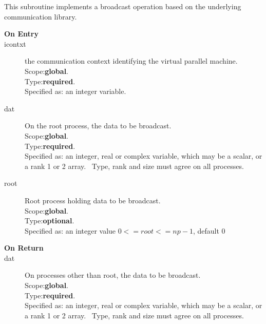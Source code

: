 This subroutine implements a broadcast operation based on the
underlying communication library. 
\begin{description}
\item[\bf  On Entry ]
\item[icontxt] the communication context identifying the virtual
  parallel machine.\\
Scope:{\bf global}.\\
Type:{\bf required}.\\
Specified as: an integer variable.
\item[dat] On the root process, the data to be broadcast.\\
Scope:{\bf global}.\\
Type:{\bf required}.\\
Specified as: an integer, real or complex variable, which may be a
scalar, or a rank 1 or 2 array. \
Type, rank and size must agree on all processes.
\item[root] Root process holding data to be broadcast.\\
Scope:{\bf global}.\\
Type:{\bf optional}.\\
Specified as: an integer value $0<= root <= np-1$, default 0 \
\end{description}


\begin{description}
\item[\bf On Return]
\item[dat] On processes other than  root, the data to be broadcast.\\
Scope:{\bf global}.\\
Type:{\bf required}.\\
Specified as: an integer, real or complex variable, which may be a
scalar, or a rank 1 or 2 array. \
Type, rank and size must agree on all processes.
\end{description}




